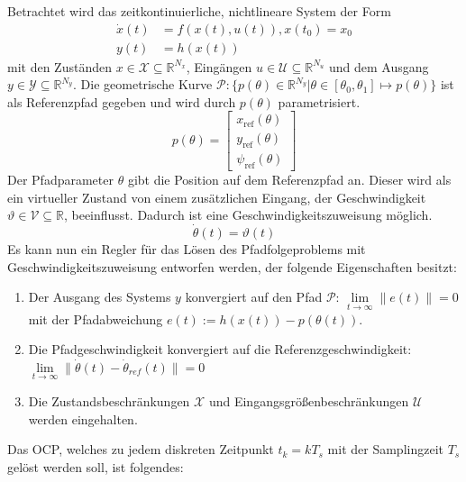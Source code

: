 \medskip \noindent Betrachtet wird das zeitkontinuierliche, nichtlineare System der Form 
\begin{align}
    \dot{x}(t)  &= f(x(t),u(t)), x(t_0)= x_0\\
    y(t)        &= h(x(t)) 
\end{align}
mit den Zuständen $x\in\mathcal{X}\subseteq\mathbb{R}^{N_x}$, Eingängen $u\in\mathcal{U}\subseteq\mathbb{R}^{N_u}$ und dem Ausgang \linebreak $y\in\mathcal{Y}\subseteq\mathbb{R}^{N_y}$. Die geometrische Kurve $\mathcal{P}:\{p(\theta)\in\mathbb{R}^{N_y}|\theta\in[\theta_0,\theta_1]\mapsto p(\theta)\}$ ist als Referenzpfad gegeben und wird durch $p(\theta)$ parametrisiert.
\begin{equation}
    p(\theta) = 
    \begin{bmatrix}
        x_{\text{ref}}(\theta) \\
        y_{\text{ref}}(\theta) \\
        \psi_{\text{ref}}(\theta)
    \end{bmatrix}    
\end{equation}
Der Pfadparameter $\theta$ gibt die Position auf dem Referenzpfad an. Dieser wird als ein virtueller Zustand von einem zusätzlichen Eingang, der Geschwindigkeit $\vartheta\in\mathcal{V}\subseteq\mathbb{R}$, beeinflusst. Dadurch ist eine Geschwindigkeitszuweisung möglich.
\begin{equation}
    \dot{\theta}(t)=\vartheta(t)
\end{equation}
\noindent Es kann nun ein Regler für das Lösen des Pfadfolgeproblems mit Geschwindigkeitszuweisung entworfen werden, der folgende Eigenschaften besitzt:
\begin{enumerate}
    \item Der Ausgang des Systems $y$ konvergiert auf den Pfad $\mathcal{P}$: $\lim \limits_{t \to \infty} \|e(t)\| = 0$ mit der Pfadabweichung $e(t) := h(x(t)) - p(\theta(t))$.
    \item Die Pfadgeschwindigkeit konvergiert auf die Referenzgeschwindigkeit: $\lim \limits_{t \to \infty} \|\dot{\theta}(t)-\dot{\theta}_{ref}(t)\| = 0$
    \item Die Zustandsbeschränkungen $\mathcal{X}$ und Eingangsgrößenbeschränkungen $\mathcal{U}$ werden eingehalten.
\end{enumerate}
\medskip
\noindent Das OCP, welches zu jedem diskreten Zeitpunkt $t_k=kT_s$ mit der Samplingzeit $T_s$ gelöst werden soll, ist folgendes:
